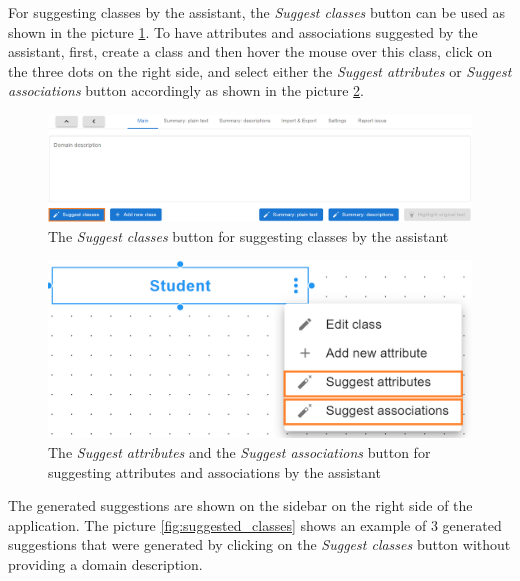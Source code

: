 For suggesting classes by the assistant, the \textit{Suggest classes} button can be used as shown in the picture \ref{fig:suggest_classes}. To have attributes and associations suggested by the assistant, first, create a class and then hover the mouse over this class, click on the three dots on the right side, and select either the \textit{Suggest attributes} or \textit{Suggest associations} button accordingly as shown in the picture \ref{fig:suggest_attributes}.

\begin{figure}[!h]
    \includegraphics[scale=0.29]{../docs/images/frontend/suggest-classes.png}
    \caption{\centering The \textit{Suggest classes} button for suggesting classes by the assistant}
    \label{fig:suggest_classes}
\end{figure}

\begin{figure}[!h]
    \includegraphics[scale=0.29]{../docs/images/frontend/suggest-attributes.png}
    \caption{\centering The \textit{Suggest attributes} and the \textit{Suggest associations} button for suggesting attributes and associations by the assistant}
    \label{fig:suggest_attributes}
\end{figure}


The generated suggestions are shown on the sidebar on the right side of the application. The picture \ref{fig:suggested_classes} shows an example of 3 generated suggestions that were generated by clicking on the \textit{Suggest classes} button without providing a domain description.


